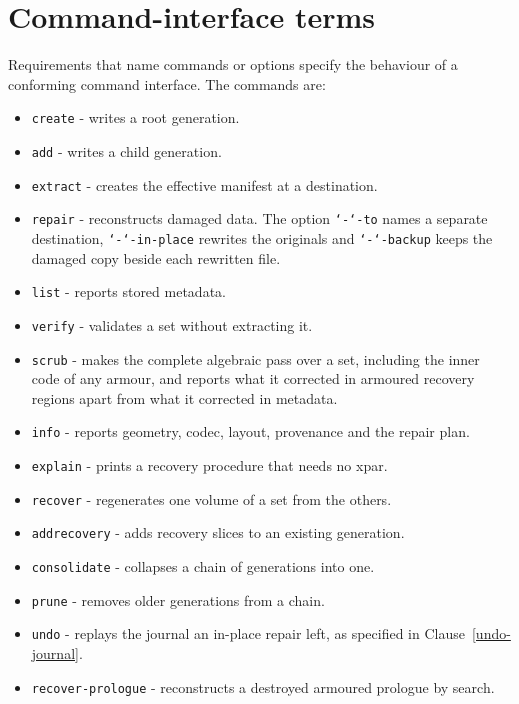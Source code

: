 \documentclass[10pt,a4paper]{report}
\newcounter{specparagraph}[section]
\newcommand{\specp}{\refstepcounter{specparagraph}\noindent
  \makebox[0pt][r]{\textsuperscript{\scriptsize[\thespecparagraph]}\hspace{0.7em}}}
\newcommand{\option}[1]{\texttt{\char`-\char`-#1}}
\begin{document}
\section{Command-interface terms}

\specp Requirements that name commands or options specify the behaviour of a
conforming command interface. The commands are:

\begin{itemize}
\item \verb|create| - writes a root generation.
\item \verb|add| - writes a child generation.
\item \verb|extract| - creates the effective manifest at a destination.
\item \verb|repair| - reconstructs damaged data. The option \option{to} names a
separate destination, \option{in-place} rewrites the originals and
\option{backup} keeps the damaged copy beside each rewritten file.
\item \verb|list| - reports stored metadata.
\item \verb|verify| - validates a set without extracting it.
\item \verb|scrub| - makes the complete algebraic pass over a set, including
the inner code of any armour, and reports what it corrected in armoured
recovery regions apart from what it corrected in metadata.
\item \verb|info| - reports geometry, codec, layout, provenance and the repair
plan.
\item \verb|explain| - prints a recovery procedure that needs no xpar.
\item \verb|recover| - regenerates one volume of a set from the others.
\item \verb|addrecovery| - adds recovery slices to an existing generation.
\item \verb|consolidate| - collapses a chain of generations into one.
\item \verb|prune| - removes older generations from a chain.
\item \verb|undo| - replays the journal an in-place repair left, as specified
in Clause~\ref{undo-journal}.
\item \verb|recover-prologue| - reconstructs a destroyed armoured prologue by
search.
\end{itemize}
\end{document}

